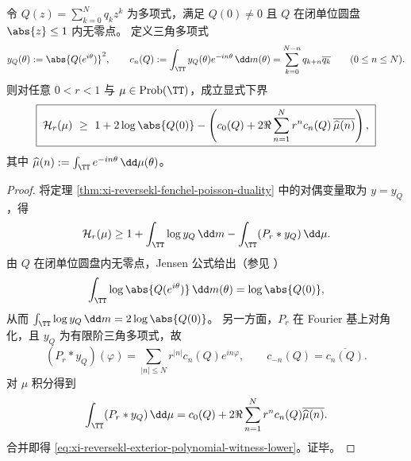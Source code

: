 \begin{proposition}[外多项式证书族与显式可核验下界]\label{prop:xi-reversekl-exterior-polynomial-witness-lower}
令 \(Q(z)=\sum_{k=0}^N q_k z^k\) 为多项式，满足 \(Q(0)\neq 0\) 且 \(Q\) 在闭单位圆盘 \(\abs{z}\le 1\) 内无零点。
定义三角多项式
\[
y_Q(\theta):=\abs{Q(e^{i\theta})}^2,
\qquad
c_n(Q):=\int_{\TT}y_Q(\theta)e^{-in\theta}\,\dd m(\theta)
=\sum_{k=0}^{N-n}q_{k+n}\overline{q_k}\qquad(0\le n\le N).
\]
则对任意 \(0<r<1\) 与 \(\mu\in\mathrm{Prob}(\TT)\)，成立显式下界
\begin{equation}\label{eq:xi-reversekl-exterior-polynomial-witness-lower}
\boxed{\;
\mathcal H_r(\mu)\ \ge\ 1+2\log\abs{Q(0)}
-\left(c_0(Q)+2\Re\sum_{n=1}^N r^n c_n(Q)\,\overline{\widehat\mu(n)}\right),
\;}
\end{equation}
其中 \(\widehat\mu(n):=\int_{\TT}e^{-in\theta}\,\dd\mu(\theta)\)。
\end{proposition}
\begin{proof}
将定理 \ref{thm:xi-reversekl-fenchel-poisson-duality} 中的对偶变量取为 \(y=y_Q\)，得
\[
\mathcal H_r(\mu)\ge 1+\int_{\TT}\log y_Q\,\dd m-\int_{\TT}(P_r*y_Q)\,\dd\mu.
\]
由 \(Q\) 在闭单位圆盘内无零点，Jensen 公式给出（参见 \cite{Ahlfors1979ComplexAnalysis}）
\[
\int_{\TT}\log\abs{Q(e^{i\theta})}\,\dd m(\theta)=\log\abs{Q(0)},
\]
从而 \(\int_{\TT}\log y_Q\,\dd m=2\log\abs{Q(0)}\)。
另一方面，\(P_r\) 在 Fourier 基上对角化，且 \(y_Q\) 为有限阶三角多项式，故
\[
(P_r*y_Q)(\varphi)=\sum_{|n|\le N}r^{|n|}c_n(Q)e^{in\varphi},
\qquad
c_{-n}(Q)=\overline{c_n(Q)}.
\]
对 \(\mu\) 积分得到
\[
\int_{\TT}(P_r*y_Q)\,\dd\mu
=c_0(Q)+2\Re\sum_{n=1}^N r^n c_n(Q)\overline{\widehat\mu(n)}.
\]
合并即得 \eqref{eq:xi-reversekl-exterior-polynomial-witness-lower}。证毕。
\end{proof}

